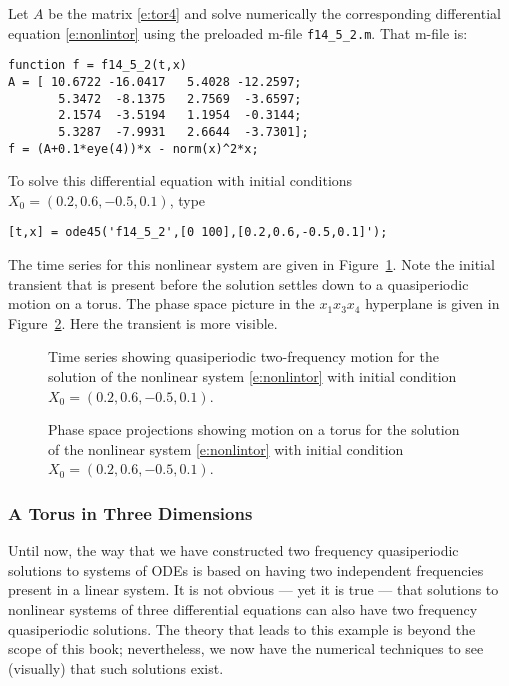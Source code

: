 \documentclass{ximera}
\begin{document}
Let $A$ be the matrix \eqref{e:tor4} and solve numerically the corresponding
differential equation \eqref{e:nonlintor} using the preloaded m-file 
{\tt f14\_5\_2.m}. That m-file is:
\begin{verbatim}
function f = f14_5_2(t,x)
A = [ 10.6722 -16.0417   5.4028 -12.2597;
       5.3472  -8.1375   2.7569  -3.6597;
       2.1574  -3.5194   1.1954  -0.3144;
       5.3287  -7.9931   2.6644  -3.7301];
f = (A+0.1*eye(4))*x - norm(x)^2*x;
\end{verbatim}
To solve this differential equation with initial conditions 
$X_0=(0.2,0.6,-0.5,0.1)$, type
\begin{verbatim}
[t,x] = ode45('f14_5_2',[0 100],[0.2,0.6,-0.5,0.1]');
\end{verbatim}

The time series for this nonlinear system are given in Figure~\ref{F:tornlts}.
Note the initial transient that is present before the solution settles 
down to a quasiperiodic motion on a torus.
  The phase space picture in the $x_1x_3x_4$ hyperplane is given 
in Figure~\ref{F:tornlps}.  Here the transient is more visible.
 
\begin{figure}[htb]
   \centerline{%
   }
   \caption{Time series showing quasiperiodic two-frequency motion for the 
	solution of the nonlinear system \protect\eqref{e:nonlintor} with 
	initial condition $X_0=(0.2,0.6,-0.5,0.1)$.}
   \label{F:tornlts}
\end{figure}

\begin{figure}[htb]
   \centerline{%
   }
   \caption{Phase space projections showing motion on a torus for the 
	solution of the nonlinear system \protect\eqref{e:nonlintor} with 
	initial condition $X_0=(0.2,0.6,-0.5,0.1)$.}
   \label{F:tornlps}
\end{figure}



\subsubsection*{A Torus in Three Dimensions}

Until now, the way that we have constructed two frequency quasiperiodic 
solutions to systems of ODEs is based on having two independent frequencies 
present in a linear system.  It is not obvious --- yet it is true --- 
that solutions to nonlinear systems of three differential equations 
can also have two frequency quasiperiodic 
solutions.  The theory that 
leads to this example is beyond the scope of this book; nevertheless, we
now have the numerical techniques to see (visually) that such solutions 
exist.
\end{document}
